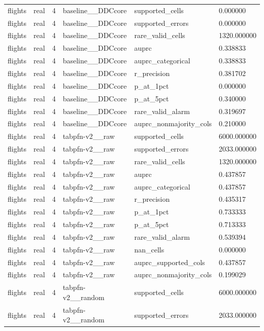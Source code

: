 \begin{tabular}{llllll}
flights & real & 4 & baseline\_\_DDCcore & supported\_cells & 0.000000 \\
flights & real & 4 & baseline\_\_DDCcore & supported\_errors & 0.000000 \\
flights & real & 4 & baseline\_\_DDCcore & rare\_valid\_cells & 1320.000000 \\
flights & real & 4 & baseline\_\_DDCcore & auprc & 0.338833 \\
flights & real & 4 & baseline\_\_DDCcore & auprc\_categorical & 0.338833 \\
flights & real & 4 & baseline\_\_DDCcore & r\_precision & 0.381702 \\
flights & real & 4 & baseline\_\_DDCcore & p\_at\_1pct & 0.000000 \\
flights & real & 4 & baseline\_\_DDCcore & p\_at\_5pct & 0.340000 \\
flights & real & 4 & baseline\_\_DDCcore & rare\_valid\_alarm & 0.319697 \\
flights & real & 4 & baseline\_\_DDCcore & auprc\_nonmajority\_cols & 0.210000 \\
flights & real & 4 & tabpfn-v2\_\_raw & supported\_cells & 6000.000000 \\
flights & real & 4 & tabpfn-v2\_\_raw & supported\_errors & 2033.000000 \\
flights & real & 4 & tabpfn-v2\_\_raw & rare\_valid\_cells & 1320.000000 \\
flights & real & 4 & tabpfn-v2\_\_raw & auprc & 0.437857 \\
flights & real & 4 & tabpfn-v2\_\_raw & auprc\_categorical & 0.437857 \\
flights & real & 4 & tabpfn-v2\_\_raw & r\_precision & 0.435317 \\
flights & real & 4 & tabpfn-v2\_\_raw & p\_at\_1pct & 0.733333 \\
flights & real & 4 & tabpfn-v2\_\_raw & p\_at\_5pct & 0.713333 \\
flights & real & 4 & tabpfn-v2\_\_raw & rare\_valid\_alarm & 0.539394 \\
flights & real & 4 & tabpfn-v2\_\_raw & nan\_cells & 0.000000 \\
flights & real & 4 & tabpfn-v2\_\_raw & auprc\_supported\_cols & 0.437857 \\
flights & real & 4 & tabpfn-v2\_\_raw & auprc\_nonmajority\_cols & 0.199029 \\
flights & real & 4 & tabpfn-v2\_\_random & supported\_cells & 6000.000000 \\
flights & real & 4 & tabpfn-v2\_\_random & supported\_errors & 2033.000000 \\

\end{tabular}
